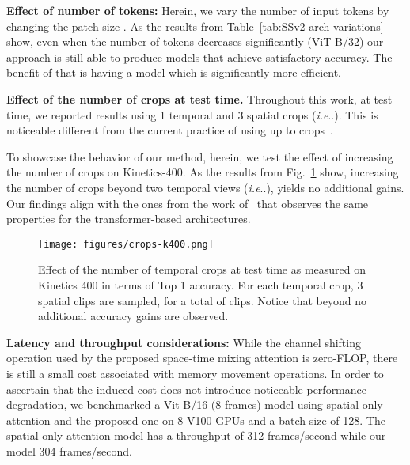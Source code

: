 \documentclass{article}
\makeatletter
\DeclareRobustCommand\onedot{\futurelet\@let@token\@onedot}
\def\@onedot{\ifx\@let@token.\else.\null\fi\xspace}
\def\ie{\emph{i.e}\onedot} \def\Ie{\emph{I.e}\onedot}
\makeatother
\begin{document}
\noindent\textbf{Effect of number of tokens:} Herein, we vary the number of input tokens by changing the patch size . As the results from Table~\ref{tab:SSv2-arch-variations} show, even when the number of tokens decreases significantly (ViT-B/32) our approach is still able to produce models that achieve satisfactory accuracy. The benefit of that is having a model which is significantly more efficient. 

\noindent \textbf{Effect of the number of crops at test time.} Throughout this work, at test time, we reported results using 1 temporal and 3 spatial crops (\ie ). This is noticeable different from the current practice of using up to  crops~\citep{feichtenhofer2019slowfast,arnab2021vivit}. 

To showcase the behavior of our method, herein, we test the effect of increasing the number of crops on Kinetics-400. As the results from Fig.~\ref{fig:k400-ncrops} show, increasing the number of crops beyond two temporal views (\ie ), yields no additional gains. Our findings align with the ones from the work of~\citet{bertasius2021space} that observes the same properties for the transformer-based architectures.

\begin{figure}[h]
    \centering
    \texttt{[image: figures/crops-k400.png]}
    \caption{Effect of the number of temporal crops at test time as measured on Kinetics 400 in terms of Top 1 accuracy. For each temporal crop, 3 spatial clips are sampled, for a total of  clips. Notice that beyond  no additional accuracy gains are observed.}
    \label{fig:k400-ncrops}
\end{figure}

\noindent \textbf{Latency and throughput considerations:} While the channel shifting operation used by the proposed space-time mixing attention is zero-FLOP, there is still a small cost associated with memory movement operations. In order to ascertain that the induced cost does not introduce noticeable performance degradation, we benchmarked a Vit-B/16 (8 frames) model using spatial-only attention and the proposed one on 8 V100 GPUs and a batch size of 128. The spatial-only attention model has a throughput of 312 frames/second while our model 304 frames/second.
\end{document}
